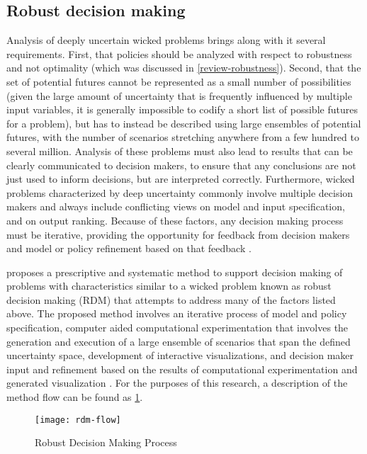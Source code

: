     \subsection{Robust decision making}\label{review-rdm}
    Analysis of deeply uncertain wicked problems brings along with it several requirements. First, that policies should be analyzed with respect to robustness and not optimality (which was discussed in \cref{review-robustness}). Second, that the set of potential futures cannot be represented as a small number of possibilities (given the large amount of uncertainty that is frequently influenced by multiple input variables, it is generally impossible to codify a short list of possible futures for a problem), but has to instead be described using large ensembles of potential futures, with the number of scenarios stretching anywhere from a few hundred to several million. Analysis of these problems must also lead to results that can be clearly communicated to decision makers, to ensure that any conclusions are not just used to inform decisions, but are interpreted correctly. Furthermore, wicked problems characterized by deep uncertainty commonly involve multiple decision makers and always include conflicting views on model and input specification, and on output ranking. Because of these factors, any decision making process must be iterative, providing the opportunity for feedback from decision makers and model or policy refinement based on that feedback \citep{Tsoukias2008}. 
    
    \citet{Lempert2003} proposes a prescriptive and systematic method to support decision making of problems with characteristics similar to a wicked problem known as robust decision making (RDM) that attempts to address many of the factors listed above. The proposed method involves an iterative process of model and policy specification, computer aided computational experimentation that involves the generation and execution of a large ensemble of scenarios that span the defined uncertainty space, development of interactive visualizations, and decision maker input and refinement based on the results of computational experimentation and generated visualization \citep{Lempert2006}. For the purposes of this research, a description of the method flow can be found as \cref{fig:rdm-flow}. 

    \begin{figure}[ht]
        \centering
        \captionsetup{justification=centering}
        
        \texttt{[image: rdm-flow]}
        \caption{Robust Decision Making Process}
        \label{fig:rdm-flow}
    \end{figure}
    
